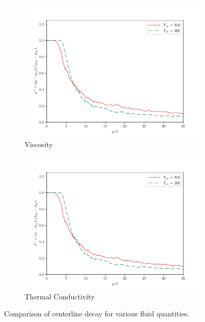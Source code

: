 \begin{figure}[H]
\begin{center}
\begin{subfigure}{0.45\textwidth}
	\includegraphics[scale=.35]{figures/Plots/centerline/mu_centerline_scaled.pdf}
	\caption{Viscosity} \label{noniso_mu_centerline_1}
\end{subfigure}
\begin{subfigure}{0.45\textwidth}
\centering
	\includegraphics[scale=.35]{figures/Plots/centerline/lam_centerline_scaled.pdf}
	\caption{Thermal Conductivity} \label{noniso_lam_centerline_1}
\end{subfigure}

\caption{Comparison of centerline decay for various fluid quantities.}
\label{noniso_centerline_features}
\end{center}
\end{figure}

